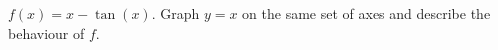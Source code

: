 {$f(x) = x - \tan(x)$.  Graph $y = x$ on the same set of axes and describe the behaviour of $f$.  }
{}
